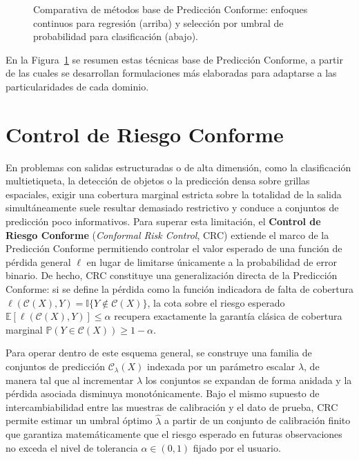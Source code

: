 \begin{figure}[H]
    \centering
    \resizebox{1.0\textwidth}{!}{}
    \caption{Comparativa de métodos base de Predicción Conforme: enfoques continuos para regresión (arriba) y selección por umbral de probabilidad para clasificación (abajo).}
    \label{fig:conformal_full_panel}
\end{figure}

En la Figura~\ref{fig:conformal_full_panel} se resumen estas técnicas base de Predicción Conforme, a partir de las cuales se desarrollan formulaciones más elaboradas para adaptarse a las particularidades de cada dominio.



\section{Control de Riesgo Conforme}

En problemas con salidas estructuradas o de alta dimensión, como la clasificación multietiqueta, la detección de objetos o la predicción densa sobre grillas espaciales, exigir una cobertura marginal estricta sobre la totalidad de la salida simultáneamente suele resultar demasiado restrictivo y conduce a conjuntos de predicción poco informativos. Para superar esta limitación, el \textbf{Control de Riesgo Conforme} (\textit{Conformal Risk Control}, CRC) extiende el marco de la Predicción Conforme permitiendo controlar el valor esperado de una función de pérdida general $\ell$ en lugar de limitarse únicamente a la probabilidad de error binario. De hecho, CRC constituye una generalización directa de la Predicción Conforme: si se define la pérdida como la función indicadora de falta de cobertura $\ell(\mathcal{C}(X), Y) = \mathbb{I}\{Y \notin \mathcal{C}(X)\}$, la cota sobre el riesgo esperado $\mathbb{E}[\ell(\mathcal{C}(X), Y)] \leq \alpha$ recupera exactamente la garantía clásica de cobertura marginal $\mathbb{P}(Y \in \mathcal{C}(X)) \geq 1 - \alpha$.

Para operar dentro de este esquema general, se construye una familia de conjuntos de predicción $\mathcal{C}_\lambda(X)$ indexada por un parámetro escalar $\lambda$, de manera tal que al incrementar $\lambda$ los conjuntos se expandan de forma anidada y la pérdida asociada disminuya monotónicamente. Bajo el mismo supuesto de intercambiabilidad entre las muestras de calibración y el dato de prueba, CRC permite estimar un umbral óptimo $\hat{\lambda}$ a partir de un conjunto de calibración finito que garantiza matemáticamente que el riesgo esperado en futuras observaciones no exceda el nivel de tolerancia $\alpha \in (0,1)$ fijado por el usuario.

